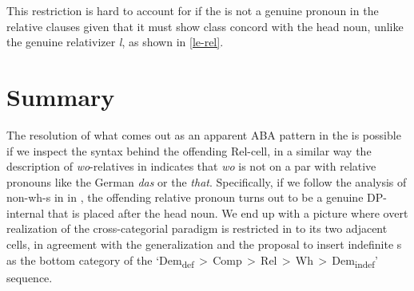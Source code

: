 This restriction is hard to account for if the  is not a genuine  pronoun in the  relative clauses given that it must show class concord with the head noun, unlike the genuine relativizer \textit{l}, as shown in \ref{le-rel}.

\section{Summary}

The resolution of what comes out as an apparent ABA pattern  in the   is possible if we inspect the syntax behind the offending Rel-cell, in a similar way the description of \textit{wo}-relatives in  indicates that \textit{wo} is not on a par with relative pronouns like the German \textit{das} or the  \textit{that}. Specifically, if we follow the analysis of non-wh-s in  in \cite{Jenks-etall}, the offending relative pronoun turns out to be a genuine DP-internal  that is placed after the head noun. We end up with a picture where overt realization of the cross-categorial paradigm is restricted in  to its two adjacent cells, in agreement with the  generalization and the proposal to insert indefinite s as the bottom category of the `Dem\textsubscript{def}\,$>$\,Comp\,$>$\,Rel\,$>$\,Wh\,$>$\,Dem\textsubscript{indef}' sequence.





